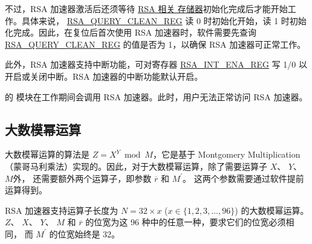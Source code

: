 \documentclass[main\_\_CN.tex]{subfiles}
\begin{document}
不过，RSA 加速器激活后还须等待 \hyperref[sec:mem-sum]{RSA 相关 存储器}初始化完成后才能开始工作。具体来说， \hyperref[regdesc:RSAQUERYCLEANREG]{RSA\_QUERY\_CLEAN\_REG} 读 0 时初始化开始，读 1 时初始化完成。因此，在复位后首次使用 RSA 加速器时，软件需要先查询 \hyperref[regdesc:RSAQUERYCLEANREG]{RSA\_QUERY\_CLEAN\_REG} 的值是否为 1，以确保 RSA 加速器可正常工作。

此外，RSA 加速器支持中断功能，可对寄存器 \hyperref[regdesc:RSAINTENAREG]{RSA\_INT\_ENA\_REG} 写 1/0 以开启或关闭中断。RSA 加速器的中断功能默认开启。

\begin{importantlisting}
\vspace{-0.5em}

    \chipname{} 的  模块在工作期间会调用 RSA 加速器。此时，用户无法正常访问 RSA 加速器。
\end{importantlisting}
\subsection{大数模幂运算} \label{sec:rsa-large-modular-Exponentiation}

大数模幂运算的算法是 \begin{math}Z = X^{Y} \bmod M\end{math}，它是基于 Montgomery Multiplication （蒙哥马利乘法）实现的。因此，对于大数模幂运算，除了需要运算子
\begin{math}X\end{math}、
\begin{math}Y\end{math}、
\begin{math}M\end{math}外，
还需要额外两个运算子，即参数
\begin{math}\overline{r}\end{math} 和
\begin{math}M^{\prime}\end{math}。
这两个参数需要通过软件提前运算得到。

RSA 加速器支持运算子长度为
\begin{math}N = 32 \times x\end{math} (\begin{math}x \in \{ 1,2,3, \dots, 96\} \end{math}) 的大数模幂运算。
\begin{math}Z\end{math}、
\begin{math}X\end{math}、
\begin{math}Y\end{math}、
\begin{math}M\end{math} 和
\begin{math}\overline{r}\end{math}
的位宽为这 96 种中的任意一种，要求它们的位宽必须相同，
而 \begin{math}M^{\prime}\end{math} 的位宽始终是 32。
\end{document}
